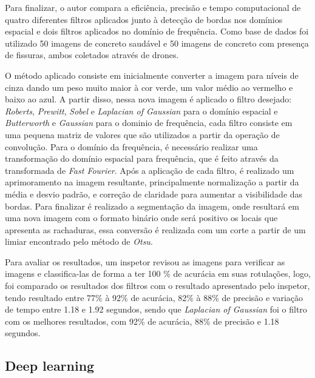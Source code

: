 Para finalizar, o autor  compara a eficiência, precisão e tempo computacional de quatro diferentes filtros aplicados junto à detecção de bordas nos domínios espacial e dois filtros aplicados no domínio de frequência. Como base de dados foi utilizado 50 imagens de concreto saudável e 50 imagens de concreto com presença de fissuras, ambos coletados através de drones. 

O método aplicado consiste em inicialmente converter a imagem para níveis de cinza dando um peso muito maior à cor verde, um valor médio ao vermelho e baixo ao azul. %
A partir disso, nessa nova imagem é aplicado o filtro desejado: \textit{Roberts}, \textit{Prewitt}, \textit{Sobel} e \textit{Laplacian of Gaussian} para o domínio espacial e \textit{Butterworth} e \textit{Gaussian} para o dominio de frequência, cada filtro consiste em uma pequena matriz de valores que são utilizados a partir da operação de convolução.
Para o domínio da frequência, é necessário realizar uma transformação do domínio espacial para frequência, que é feito através da transformada de \textit{Fast Fourier}. Após a aplicação de cada filtro, é realizado um aprimoramento na imagem resultante, principalmente normalização a partir da média e desvio padrão, e correção de claridade para aumentar a visibilidade das bordas. Para finalizar é realizado a segmentação da imagem, onde resultará em uma nova imagem com o formato binário onde será positivo os locais que apresenta as rachaduras, essa conversão é realizada com um corte a partir de um limiar encontrado pelo método de \textit{Otsu}.

Para avaliar os resultados, um inspetor revisou as imagens para verificar as imagens e classifica-las de forma a ter 100 \% de acurácia em suas rotulações, logo, foi comparado os resultados dos filtros com o resultado apresentado pelo inspetor, tendo resultado entre 77\% à 92\% de acurácia, 82\% à 88\% de precisão e variação de tempo entre 1.18 e 1.92 segundos, sendo que \textit{Laplacian of Gaussian} foi o filtro com os melhores resultados, com 92\% de acurácia, 88\% de precisão e 1.18 segundos.


\subsection{Deep learning}

